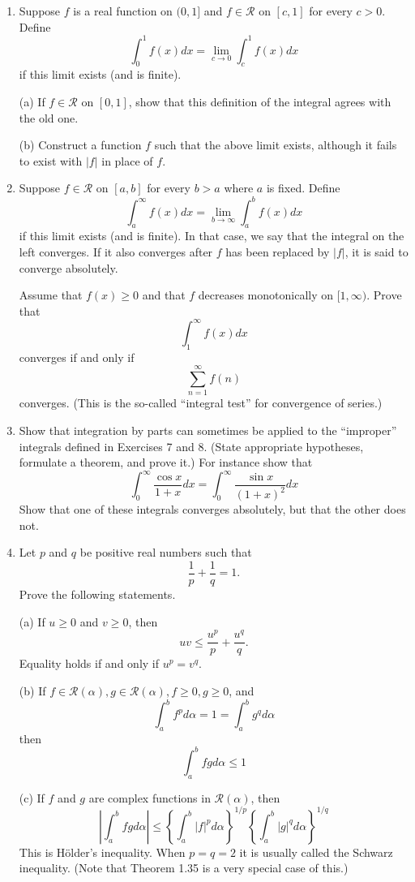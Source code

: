 \documentclass[10pt]{article}
\begin{document}
\begin{enumerate}
  \item Suppose $f$ is a real function on $(0,1]$ and $f \in \mathscr{R}$ on $[c, 1]$ for every $c>0$. Define
  $$
  \int_{0}^{1} f(x) d x=\lim _{c \rightarrow 0} \int_{c}^{1} f(x) d x
  $$
  if this limit exists (and is finite).

  (a) If $f \in \mathscr{R}$ on $[0,1]$, show that this definition of the integral agrees with the old one.

  (b) Construct a function $f$ such that the above limit exists, although it fails to exist with $|f|$ in place of $f$.

  \item Suppose $f \in \mathscr{R}$ on $[a, b]$ for every $b>a$ where $a$ is fixed. Define
  $$
  \int_{a}^{\infty} f(x) d x=\lim _{b \rightarrow \infty} \int_{a}^{b} f(x) d x
  $$
  if this limit exists (and is finite). In that case, we say that the integral on the left converges. If it also converges after $f$ has been replaced by $|f|$, it is said to converge absolutely.

  Assume that $f(x) \geq 0$ and that $f$ decreases monotonically on $[1, \infty)$. Prove that
  $$
  \int_{1}^{\infty} f(x) d x
  $$
  converges if and only if
  $$
  \sum_{n=1}^{\infty} f(n)
  $$
  converges. (This is the so-called ``integral test'' for convergence of series.)

  \item Show that integration by parts can sometimes be applied to the ``improper'' integrals defined in Exercises 7 and 8. (State appropriate hypotheses, formulate a theorem, and prove it.) For instance show that
  $$
  \int_{0}^{\infty} \frac{\cos x}{1+x} d x=\int_{0}^{\infty} \frac{\sin x}{(1+x)^{2}} d x
  $$
  Show that one of these integrals converges absolutely, but that the other does not.

  \item Let $p$ and $q$ be positive real numbers such that
  $$
  \frac{1}{p}+\frac{1}{q}=1 .
  $$
  Prove the following statements.

  (a) If $u \geq 0$ and $v \geq 0$, then
  $$
  u v \leq \frac{u^{p}}{p}+\frac{u^{q}}{q} .
  $$
  Equality holds if and only if $u^{p}=v^{q}$.

  (b) If $f \in \mathscr{R}(\alpha), g \in \mathscr{R}(\alpha), f \geq 0, g \geq 0$, and
  $$
  \int_{a}^{b} f^{p} d \alpha=1=\int_{a}^{b} g^{q} d \alpha
  $$
  then
  $$
  \int_{a}^{b} f g d \alpha \leq 1
  $$

  (c) If $f$ and $g$ are complex functions in $\mathscr{R}(\alpha)$, then
  $$
  \left|\int_{a}^{b} f g d \alpha\right| \leq\left\{\int_{a}^{b}|f|^{p} d \alpha\right\}^{1 / p}\left\{\int_{a}^{b}|g|^{q} d \alpha\right\}^{1 / q}
  $$
  This is Hölder's inequality. When $p=q=2$ it is usually called the Schwarz inequality. (Note that Theorem 1.35 is a very special case of this.)


\end{enumerate}
\end{document}

